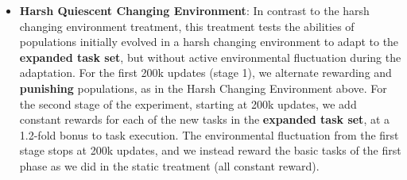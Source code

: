 \documentclass[10pt,letterpaper]{article}
\begin{document}
\begin{itemize}
	\item \textbf{Harsh Quiescent Changing Environment}: In contrast to the harsh changing environment treatment, this treatment tests the abilities of populations initially evolved in a harsh changing environment to adapt to the \textbf{expanded task set}, but without active environmental fluctuation during the adaptation. For the first 200k updates (stage 1), we alternate rewarding and \textbf{punishing} populations, as in the Harsh Changing Environment above. For the second stage of the experiment, starting at 200k updates, we add constant rewards for each of the new tasks in the \textbf{expanded task set}, at a 1.2-fold bonus to task execution. The environmental fluctuation from the first stage stops at 200k updates, and we instead reward the basic tasks of the first phase as we did in the static treatment (all constant reward).
\end{itemize}
\end{document}
